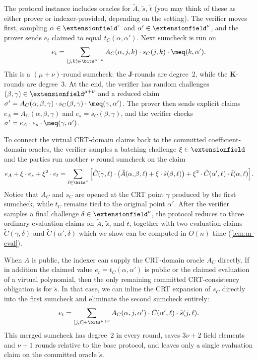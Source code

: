 The protocol instance includes oracles for $\tilde{A}$, $\tilde{s}$, $\tilde{t}$ (you may think of these as either prover or indexer-provided, depending on the setting). The verifier moves first, sampling $\alpha \in \extensionfield^\tau$ and $\alpha' \in \extensionfield^\nu$, and the prover sends $e_t$ claimed to equal $t_C(\alpha,\alpha')$. Next sumcheck is run on
\[
    e_t = \sum_{(j,k) \in \bits^{\mu+\nu}} A_C(\alpha, j, k) \cdot s_C(j, k) \cdot \meq(k, \alpha').
\]
This is a $(\mu+\nu)$-round sumcheck: the $\bm{J}$-rounds are degree~$2$, while the $\bm{K}$-rounds are degree~$3$. At the end, the verifier has random challenges $(\beta,\gamma) \in \extensionfield^{\mu+\nu}$ and a reduced claim $\sigma' = A_C(\alpha,\beta,\gamma) \cdot s_C(\beta,\gamma) \cdot \meq(\gamma,\alpha')$. The prover then sends explicit claims $e_A = A_C(\alpha,\beta,\gamma)$ and $e_s = s_C(\beta,\gamma)$, and the verifier checks $\sigma' = e_A \cdot e_s \cdot \meq(\gamma,\alpha')$.

To connect the virtual CRT-domain claims back to the committed coefficient-domain oracles, the verifier samples a batching challenge $\xi \in \extensionfield$ and the parties run another $\nu$ round sumcheck on the claim
\[
    e_A + \xi \cdot e_s + \xi^{2} \cdot e_t
    = \sum_{\ell \in \bits^{\nu}} \Big[\tilde{C}(\gamma, \ell) \cdot \big(\tilde{A}(\alpha, \beta, \ell) + \xi \cdot \tilde{s}(\beta, \ell)\big) + \xi^{2} \cdot \tilde{C}(\alpha', \ell) \cdot \tilde{t}(\alpha, \ell)\Big].
\]
Notice that $A_C$ and $s_C$ are opened at the CRT point $\gamma$ produced by the first sumcheck, while $t_C$ remains tied to the original point $\alpha'$. After the verifier samples a final challenge $\delta \in \extensionfield^\nu$, the protocol reduces to three ordinary evaluation claims on $\tilde{A}$, $\tilde{s}$, and $\tilde{t}$, together with two evaluation claims $\tilde{C}(\gamma,\delta)$ and $\tilde{C}(\alpha',\delta)$ which we show can be computed in $O(n)$ time (\cref{lem:m-eval}).

When $A$ is public, the indexer can supply the CRT-domain oracle $A_C$ directly. If in addition the claimed value $e_t = t_C(\alpha,\alpha')$ is public or the claimed evaluation of a virtual polynomial, then the only remaining committed CRT-consistency obligation is for $\tilde{s}$. In that case, we can inline the CRT expansion of $s_C$ directly into the first sumcheck and eliminate the second sumcheck entirely:
\[
    e_t = \sum_{(j,\ell) \in \bits^{\mu+\nu}} A_C(\alpha, j, \alpha') \cdot \tilde{C}(\alpha', \ell) \cdot \tilde{s}(j, \ell).
\]
This merged sumcheck has degree~$2$ in every round, saves $3\nu + 2$ field elements and $\nu+1$ rounds relative to the base protocol, and leaves only a single evaluation claim on the committed oracle $\tilde{s}$.

